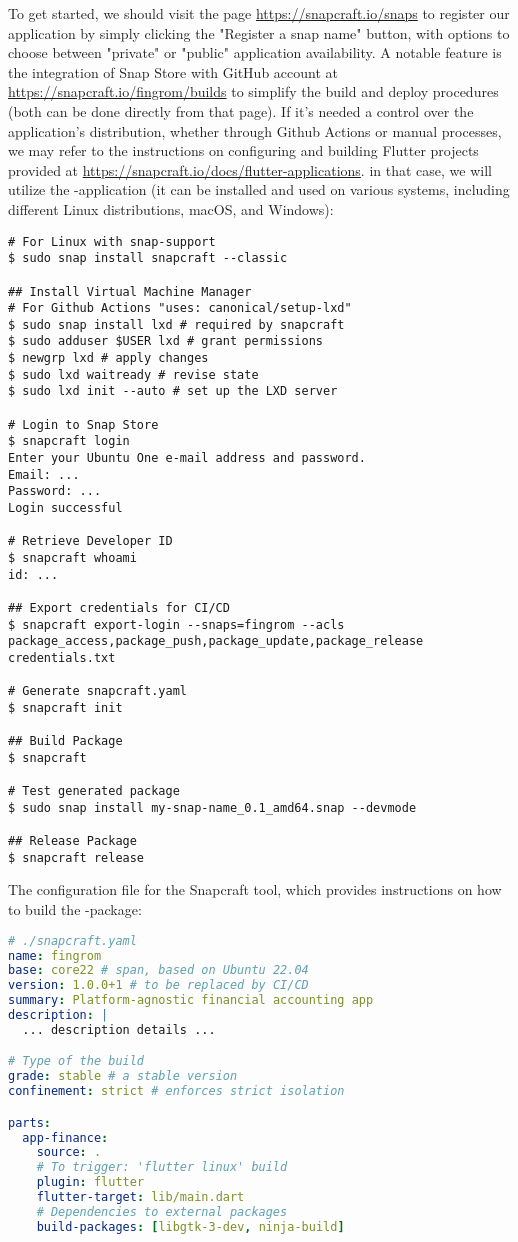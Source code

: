 To get started, we should visit the page \href{https://snapcraft.io/snaps}{https://snapcraft.io/snaps} to register 
our application by simply clicking the "Register a snap name" button, with options to choose between "private" or 
"public" application availability. A notable feature is the integration of Snap Store with GitHub account at 
\href{https://snapcraft.io/fingrom/builds}{https://snapcraft.io/fingrom/builds} to simplify the build and deploy 
procedures (both can be done directly from that page). If it's needed a control over the application's distribution, 
whether through Github Actions or manual processes, we may refer to the instructions on configuring and building 
Flutter projects provided at 
\href{https://snapcraft.io/docs/flutter-applications}{https://snapcraft.io/docs/flutter-applications}.
in that case, we will utilize the -application (it can be installed and used on various systems, including 
different Linux distributions, macOS, and Windows):

\begin{lstlisting}[language=terminal]
# For Linux with snap-support
$ sudo snap install snapcraft --classic 

## Install Virtual Machine Manager
# For Github Actions "uses: canonical/setup-lxd"
$ sudo snap install lxd # required by snapcraft
$ sudo adduser $USER lxd # grant permissions
$ newgrp lxd # apply changes
$ sudo lxd waitready # revise state
$ sudo lxd init --auto # set up the LXD server

# Login to Snap Store
$ snapcraft login
Enter your Ubuntu One e-mail address and password.
Email: ...
Password: ...
Login successful 

# Retrieve Developer ID
$ snapcraft whoami
id: ...

## Export credentials for CI/CD
$ snapcraft export-login --snaps=fingrom --acls package_access,package_push,package_update,package_release credentials.txt

# Generate snapcraft.yaml
$ snapcraft init

## Build Package
$ snapcraft

# Test generated package
$ sudo snap install my-snap-name_0.1_amd64.snap --devmode

## Release Package
$ snapcraft release
\end{lstlisting}

\noindent The configuration file for the Snapcraft tool, which provides instructions on how to build the -package:

\begin{lstlisting}[language=yaml]
# ./snapcraft.yaml
name: fingrom
base: core22 # span, based on Ubuntu 22.04 
version: 1.0.0+1 # to be replaced by CI/CD
summary: Platform-agnostic financial accounting app
description: |
  ... description details ...

# Type of the build
grade: stable # a stable version
confinement: strict # enforces strict isolation

parts:
  app-finance:
    source: .
    # To trigger: 'flutter linux' build
    plugin: flutter
    flutter-target: lib/main.dart
    # Dependencies to external packages
    build-packages: [libgtk-3-dev, ninja-build]
\end{lstlisting}

